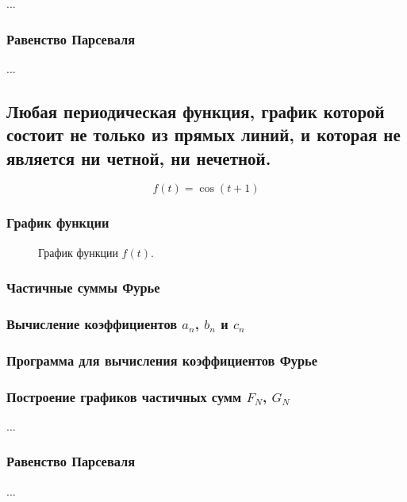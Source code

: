 \documentclass[a5paper, 10pt]{article}
\theoremstyle{definition}
\theoremstyle{plain}
\theoremstyle{remark}
\begin{document}
...

\subsubsection{Равенство Парсеваля}

...




\newpage
\subsection{Любая периодическая функция, график которой состоит не только из прямых линий, и которая не является ни четной, ни нечетной.}
\begin{equation}
f(t) = \cos (t + 1)
\end{equation}

\subsubsection{График функции}
\begin{figure}[h]
\caption{График функции $f(t)$.}
\end{figure}

\subsubsection{Частичные суммы Фурье}

\subsubsection{Вычисление коэффициентов $a_n$, $b_n$ и $c_n$}

\subsubsection{Программа для вычисления коэффициентов Фурье}

\subsubsection{Построение графиков частичных сумм $F_N$, $G_N$}

...

\subsubsection{Равенство Парсеваля}

...


 
\end{document}
